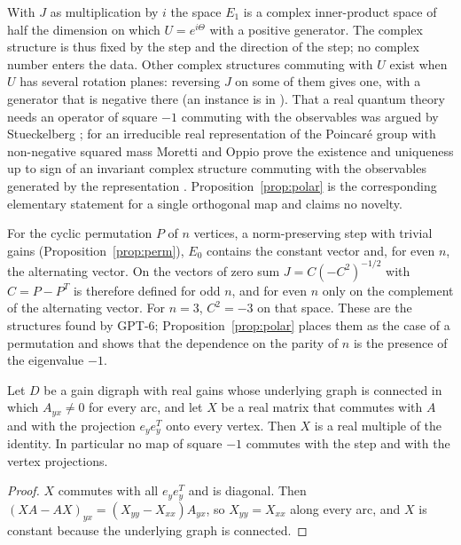 With $J$ as multiplication by $i$ the space $E_1$ is a complex inner-product space of half the dimension on which $U=e^{i\Theta}$ with a positive generator. The complex structure is thus fixed by the step and the direction of the step; no complex number enters the data. Other complex structures commuting with $U$ exist when $U$ has several rotation planes: reversing $J$ on some of them gives one, with a generator that is negative there (an instance is in \cite{comp3}). That a real quantum theory needs an operator of square $-1$ commuting with the observables was argued by Stueckelberg \cite{stueckelberg}; for an irreducible real representation of the Poincar\'e group with non-negative squared mass Moretti and Oppio prove the existence and uniqueness up to sign of an invariant complex structure commuting with the observables generated by the representation \cite{mo}. Proposition~\ref{prop:polar} is the corresponding elementary statement for a single orthogonal map and claims no novelty.

\begin{remark}\label{rem:cycles}
For the cyclic permutation $P$ of $n$ vertices, a norm-preserving step with trivial gains (Proposition~\ref{prop:perm}), $E_0$ contains the constant vector and, for even $n$, the alternating vector. On the vectors of zero sum $J=C(-C^2)^{-1/2}$ with $C=P-P^T$ is therefore defined for odd $n$, and for even $n$ only on the complement of the alternating vector. For $n=3$, $C^2=-3$ on that space. These are the structures found by GPT-6; Proposition~\ref{prop:polar} places them as the case of a permutation and shows that the dependence on the parity of $n$ is the presence of the eigenvalue $-1$.
\end{remark}

\begin{proposition}[Records]\label{prop:records}
Let $D$ be a gain digraph with real gains whose underlying graph is connected in which $A_{yx}\ne0$ for every arc, and let $X$ be a real matrix that commutes with $A$ and with the projection $e_ye_y^T$ onto every vertex. Then $X$ is a real multiple of the identity. In particular no map of square $-1$ commutes with the step and with the vertex projections.
\end{proposition}
\begin{proof}
$X$ commutes with all $e_ye_y^T$ and is diagonal. Then $(XA-AX)_{yx}=(X_{yy}-X_{xx})A_{yx}$, so $X_{yy}=X_{xx}$ along every arc, and $X$ is constant because the underlying graph is connected.
\end{proof}

